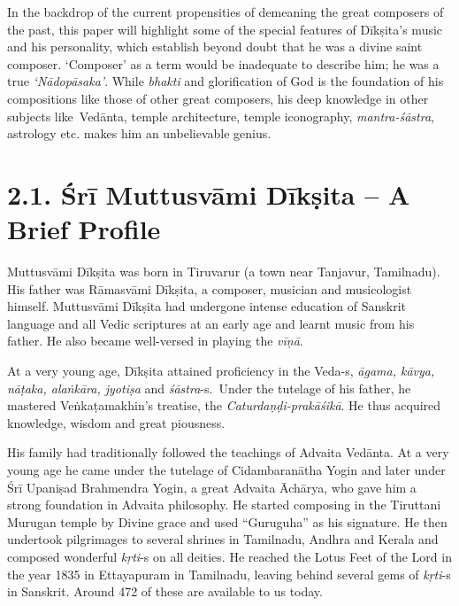 In the backdrop of the current propensities of demeaning the great composers of the past, this paper will highlight some of the special features of Dīkṣita’s music and his personality, which establish beyond doubt that he was a divine saint composer. ‘Composer’ as a term would be inadequate to describe him; he was a true \textit{‘Nādopāsaka’}. While \textit{bhakti} and glorification of God is the foundation of his compositions like those of other great composers, his deep knowledge in other subjects like Vedānta, temple architecture, temple iconography, \textit{mantra-śāstra}, astrology etc. makes him an unbelievable genius.


\vspace{-.3cm}


\section*{2.1. Śrī Muttusvāmi Dīkṣita – A Brief Profile}

Muttusvāmi Dīkṣita was born in Tiruvarur (a town near Tanjavur, Tamilnadu). His father was Rāmasvāmi Dīkṣita, a composer, musician and musicologist himself. Muttusvāmi Dīkṣita had undergone intense education of Sanskrit language and all Vedic scriptures at an early age and learnt music from his father. He also became well-versed in playing the \textit{vīṇā}.

At a very young age, Dīkṣita attained proficiency in the Veda-s, \textit{āgama, kāvya, nāṭaka, alaṅkāra, jyotiṣa} and \textit{śāstra}-s.~Under the tutelage of his father, he mastered Veṅkaṭamakhin’s treatise, the \textit{Caturdaṇḍi-prakāśikā}. He thus acquired knowledge, wisdom and great piousness.

His family had traditionally followed the teachings of Advaita Vedānta. At a very young age he came under the tutelage of Cidambaranātha Yogin and later under Śrī Upaniṣad Brahmendra Yogin, a great Advaita Āchārya, who gave him a strong foundation in Advaita philosophy. He started composing in the Tiruttani Murugan temple by Divine grace and used “Guruguha” as his signature. He then undertook pilgrimages to several shrines in Tamilnadu, Andhra and Kerala and composed wonderful \textit{kṛti}-s on all deities. He reached the Lotus Feet of the Lord in the year 1835 in Ettayapuram in Tamilnadu, leaving behind several gems of \textit{kṛti}-s in Sanskrit. Around 472 of these are available to us today.

